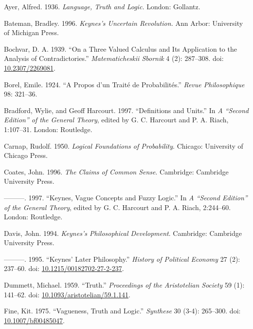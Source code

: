 \documentclass[
  11pt,
  letterpaper,
  DIV=11,
  numbers=noendperiod,
  twoside]{scrartcl}
\newlength{\cslhangindent}
\newenvironment{CSLReferences}[2] %
 {\begin{list}{}{%
  \setlength{\itemindent}{0pt}
  \setlength{\leftmargin}{0pt}
  \setlength{\parsep}{0pt}
  \ifodd #1
   \setlength{\leftmargin}{\cslhangindent}
   \setlength{\itemindent}{-1\cslhangindent}
  \fi
  \setlength{\itemsep}{#2\baselineskip}}}
 {\end{list}}
\begin{document}
\label{refs}
\begin{CSLReferences}{1}{0}
Ayer, Alfred. 1936. \emph{Language, Truth and Logic.} London: Gollantz.

Bateman, Bradley. 1996. \emph{Keynes's Uncertain Revolution.} Ann Arbor:
University of Michigan Press.

Bochvar, D. A. 1939. {``On a Three Valued Calculus and Its Application
to the Analysis of Contradictories.''} \emph{Matematicheskii Sbornik} 4
(2): 287--308. doi:
\href{https://doi.org/10.2307/2269081}{10.2307/2269081}.

Borel, Emile. 1924. {``A Propos d'un Trait{é} de Probabilit{é}s.''}
\emph{Revue Philosophique} 98: 321--36.

Bradford, Wylie, and Geoff Harcourt. 1997. {``Definitions and Units.''}
In \emph{A {``Second Edition''} of the General Theory}, edited by G. C.
Harcourt and P. A. Riach, 1:107--31. London: Routledge.

Carnap, Rudolf. 1950. \emph{Logical Foundations of Probability}.
Chicago: University of Chicago Press.

Coates, John. 1996. \emph{The Claims of Common Sense}. Cambridge:
Cambridge University Press.

---------. 1997. {``Keynes, Vague Concepts and Fuzzy Logic.''} In
\emph{A {``Second Edition''} of the General Theory}, edited by G. C.
Harcourt and P. A. Riach, 2:244--60. London: Routledge.

Davis, John. 1994. \emph{Keynes's Philosophical Development}. Cambridge:
Cambridge University Press.

---------. 1995. {``Keynes' Later Philosophy.''} \emph{History of
Political Economy} 27 (2): 237--60. doi:
\href{https://doi.org/10.1215/00182702-27-2-237}{10.1215/00182702-27-2-237}.

Dummett, Michael. 1959. {``Truth.''} \emph{Proceedings of the
Aristotelian Society} 59 (1): 141--62. doi:
\href{https://doi.org/10.1093/aristotelian/59.1.141}{10.1093/aristotelian/59.1.141}.

Fine, Kit. 1975. {``Vagueness, Truth and Logic.''} \emph{Synthese} 30
(3-4): 265--300. doi:
\href{https://doi.org/10.1007/bf00485047}{10.1007/bf00485047}.


\end{CSLReferences}
\end{document}
